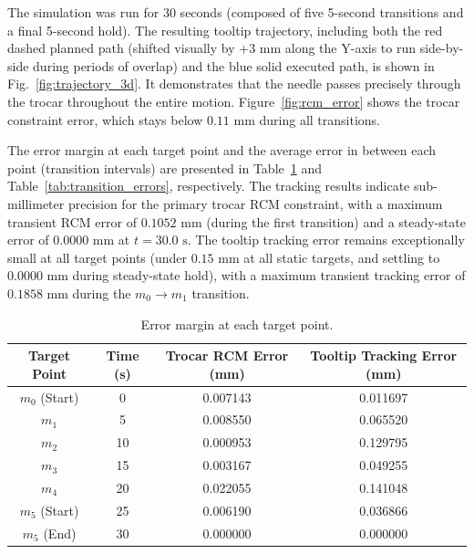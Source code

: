 \documentclass[11pt,a4paper]{article}
\begin{document}
The simulation was run for 30 seconds (composed of five 5-second transitions and a final 5-second hold). The resulting tooltip trajectory, including both the red dashed planned path (shifted visually by $+3\text{ mm}$ along the Y-axis to run side-by-side during periods of overlap) and the blue solid executed path, is shown in Fig.~\ref{fig:trajectory_3d}. It demonstrates that the needle passes precisely through the trocar throughout the entire motion. Figure~\ref{fig:rcm_error} shows the trocar constraint error, which stays below $0.11\text{ mm}$ during all transitions.

The error margin at each target point and the average error in between each point (transition intervals) are presented in Table~\ref{tab:target_errors} and Table~\ref{tab:transition_errors}, respectively. The tracking results indicate sub-millimeter precision for the primary trocar RCM constraint, with a maximum transient RCM error of $0.1052\text{ mm}$ (during the first transition) and a steady-state error of $0.0000\text{ mm}$ at $t = 30.0\text{ s}$. The tooltip tracking error remains exceptionally small at all target points (under $0.15\text{ mm}$ at all static targets, and settling to $0.0000\text{ mm}$ during steady-state hold), with a maximum transient tracking error of $0.1858\text{ mm}$ during the $m_0 \rightarrow m_1$ transition.

\begin{table}[H]
\centering
\caption{Error margin at each target point.}
\label{tab:target_errors}
\begin{tabular}{@{}cccc@{}}
\toprule
Target Point & Time (s) & Trocar RCM Error (mm) & Tooltip Tracking Error (mm) \\ \midrule
$m_0$ (Start) & 0  & 0.007143 & 0.011697 \\
$m_1$         & 5  & 0.008550 & 0.065520 \\
$m_2$         & 10 & 0.000953 & 0.129795 \\
$m_3$         & 15 & 0.003167 & 0.049255 \\
$m_4$         & 20 & 0.022055 & 0.141048 \\
$m_5$ (Start) & 25 & 0.006190 & 0.036866 \\
$m_5$ (End)   & 30 & 0.000000 & 0.000000 \\ \bottomrule
\end{tabular}
\end{table}
\end{document}

